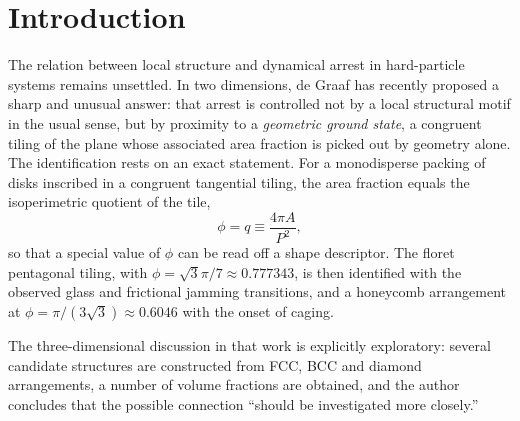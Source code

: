 \documentclass[11pt]{article}
\begin{document}
\begin{abstract}
transition-like slope change above $10.7\%$ at $\sqrt{3}\pi/7$ and $14.4\%$ at
the intermediate rung $k{=}4$ (kagome, $\phi=\sqrt{3}\pi/8$), robustly across
composition and system size, while the apparent dynamical arrest density shifts
with the observation-time criterion by $+0.041$ per decade. The ladder is
instead realised mechanically: seeded dilution confirms the zero-parameter
rigidity hierarchy set by the contact count $z=6-K$ against the Maxwell
threshold -- honeycomb floppy, kagome exactly isostatic and thermally marginal,
maple-leaf hyperstatic with a finite stability margin -- so the rung densities
are stability points of depleted solids rather than equilibrium attractors. In
three dimensions every rung of the ladder is hyperstatic.
\end{abstract}

\maketitle

\section{Introduction}

The relation between local structure and dynamical arrest in hard-particle
systems remains unsettled. In two dimensions, de Graaf has recently proposed a
sharp and unusual answer: that arrest is controlled not by a local structural
motif in the usual sense, but by proximity to a \emph{geometric ground state}, a
congruent tiling of the plane whose associated area fraction is picked out by
geometry alone. The identification rests on an exact statement. For a
monodisperse packing of disks inscribed in a congruent tangential tiling, the
area fraction equals the isoperimetric quotient of the tile,
\begin{equation}
\phi = q \equiv \frac{4\pi A}{P^2},
\label{eq:2d}
\end{equation}
so that a special value of $\phi$ can be read off a shape descriptor. The floret
pentagonal tiling, with $\phi=\sqrt{3}\pi/7\approx0.777343$, is then identified
with the observed glass and frictional jamming transitions, and a honeycomb
arrangement at $\phi=\pi/(3\sqrt{3})\approx0.6046$ with the onset of caging.

The three-dimensional discussion in that work is explicitly exploratory: several
candidate structures are constructed from FCC, BCC and diamond arrangements, a
number of volume fractions are obtained, and the author concludes that the
possible connection ``should be investigated more closely.''
\end{document}
